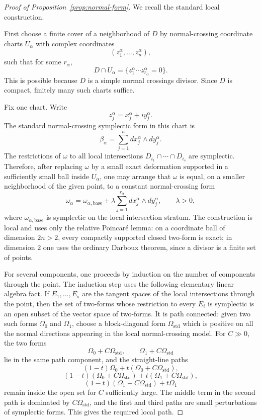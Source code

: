 \documentclass{amsart}
\theoremstyle{definition}
\begin{document}
\begin{proof}[Proof of Proposition~\ref{prop:normal-form}]
We recall the standard local construction.

First choose a finite cover of a neighborhood of $D$ by normal-crossing coordinate charts
$U_\alpha$ with complex coordinates
\[
(z_1^\alpha,\dots,z_n^\alpha),
\]
such that for some $r_\alpha$,
\[
D\cap U_\alpha
=
\{z_1^\alpha\cdots z_{r_\alpha}^\alpha=0\}.
\]
This is possible because $D$ is a simple normal crossings divisor. Since $D$ is compact,
finitely many such charts suffice.

Fix one chart. Write
\[
z_j^\alpha=x_j^\alpha+i y_j^\alpha .
\]
The standard normal-crossing symplectic form in this chart is
\[
\beta_\alpha
=
\sum_{j=1}^n dx_j^\alpha\wedge dy_j^\alpha .
\]
The restrictions of $\omega$ to all local intersections
$D_{i_1}\cap\cdots\cap D_{i_s}$ are symplectic. Therefore, after replacing
$\omega$ by a small exact deformation supported in a sufficiently small ball inside
$U_\alpha$, one may arrange that $\omega$ is equal, on a smaller neighborhood of the
given point, to a constant normal-crossing form
\[
\omega_{\alpha}
=
\omega_{\alpha,\mathrm{base}}
+
\lambda\sum_{j=1}^{r_\alpha}dx_j^\alpha\wedge dy_j^\alpha,
\qquad \lambda>0,
\]
where $\omega_{\alpha,\mathrm{base}}$ is symplectic on the local intersection stratum.
The construction is local and uses only the relative Poincar\'e lemma: on a coordinate ball
of dimension $2n>2$, every compactly supported closed two-form is exact; in dimension $2$
one uses the ordinary Darboux theorem, since a divisor is a finite set of points.

For several components, one proceeds by induction on the number of components through the
point. The induction step uses the following elementary linear algebra fact. If
$E_1,\dots,E_s$ are the tangent spaces of the local intersections through the point, then
the set of two-forms whose restriction to every $E_i$ is symplectic is an open subset of
the vector space of two-forms. It is path connected: given two such forms $\Omega_0$ and
$\Omega_1$, choose a block-diagonal form $\Omega_{\mathrm{std}}$ which is positive on all
the normal directions appearing in the local normal-crossing model. For $C\gg 0$, the two
forms
\[
\Omega_0+C\Omega_{\mathrm{std}},\qquad
\Omega_1+C\Omega_{\mathrm{std}}
\]
lie in the same path component, and the straight-line paths
\[
(1-t)\Omega_0+t(\Omega_0+C\Omega_{\mathrm{std}}),
\]
\[
(1-t)(\Omega_0+C\Omega_{\mathrm{std}})
+t(\Omega_1+C\Omega_{\mathrm{std}}),
\]
\[
(1-t)(\Omega_1+C\Omega_{\mathrm{std}})+t\Omega_1
\]
remain inside the open set for $C$ sufficiently large. The middle term in the second path
is dominated by $C\Omega_{\mathrm{std}}$, and the first and third paths are small
perturbations of symplectic forms. This gives the required local path.


\end{proof}
\end{document}
